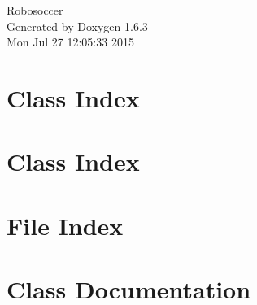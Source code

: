 \documentclass[a4paper]{book}
\begin{document}
\hypersetup{pageanchor=false}
\begin{titlepage}
\vspace*{7cm}
\begin{center}
{\Large Robosoccer }\\
\vspace*{1cm}
{\large Generated by Doxygen 1.6.3}\\
\vspace*{0.5cm}
{\small Mon Jul 27 12:05:33 2015}\\
\end{center}
\end{titlepage}
\clearemptydoublepage
{}
\tableofcontents
\clearemptydoublepage
{}
\hypersetup{pageanchor=true}
\chapter{Class Index}

\chapter{Class Index}

\chapter{File Index}

\chapter{Class Documentation}
































\end{document}
